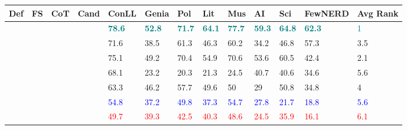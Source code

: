 \documentclass[11pt]{article}
\newcommand{\cmark}{\ding{51}}\newcommand{\xmark}{\ding{55}}\newcommand{\toolname}{PromptNER }
\begin{document}
\begin{table*}[ht]
\centering
\begin{tabular}{|l|l|l|l|l|l|l|l|l|l|l|l||l|}
\hline
Def & FS & CoT   & Cand & ConLL         & Genia         & Pol      & Lit    & Mus         & AI            & Sci       & FewNERD       & Avg Rank \\\hline
\textcolor{teal}{\cmark}        & \textcolor{teal}{\cmark}     & \textcolor{teal}{\cmark}  & \textcolor{teal}{\cmark}       & \textcolor{teal}{\textbf{78.6}} & \textcolor{teal}{\textbf{52.8}} & \textcolor{teal}{\textbf{71.7}} & \textcolor{teal}{\textbf{64.1}} & \textcolor{teal}{\textbf{77.7}} & \textcolor{teal}{\textbf{59.3}} & \textcolor{teal}{\textbf{64.8}} & \textcolor{teal}{\textbf{62.3}} & \textcolor{teal}{1}                            \\
\cmark        & \cmark     & \cmark  & \xmark      & 71.6          & 38.5          & 61.3          & 46.3          & 60.2          & 34.2          & 46.8          & 57.3          & 3.5                          \\
\cmark        & \cmark     & \xmark & \cmark       & 75.1          & 49.2          & 70.4          & 54.9          & 70.6          & 53.6          & 60.5          & 42.4          & 2.1                          \\
\cmark        & \xmark    & \cmark  & \cmark       & 68.1          & 23.2          & 20.3          & 21.3          & 24.5          & 40.7          & 40.6          & 34.6          & 5.6                          \\
\xmark       & \cmark     & \cmark  & \cmark       & 63.3          & 46.2          & 57.7          & 49.6          & 50            & 29            & 50.8          & 34.8          & 4                            \\
\textcolor{blue}{\xmark}       & \textcolor{blue}{\cmark}     & \textcolor{blue}{\cmark}  & \textcolor{blue}{\xmark}      & \textcolor{blue}{54.8}          & \textcolor{blue}{37.2}          & \textcolor{blue}{49.8}          & \textcolor{blue}{37.3}          & \textcolor{blue}{54.7}          & \textcolor{blue}{27.8}          & \textcolor{blue}{21.7}          & \textcolor{blue}{18.8}          & \textcolor{blue}{5.6}                          \\
\textcolor{red}{\xmark}       & \textcolor{red}{\cmark}     & \textcolor{red}{\xmark} & \textcolor{red}{\xmark}      & \textcolor{red}{49.7}          & \textcolor{red}{39.3}          & \textcolor{red}{42.5}          & \textcolor{red}{40.3}          & \textcolor{red}{48.6}          & \textcolor{red}{24.5}          & \textcolor{red}{35.9}          & \textcolor{red}{16.1}          & \textcolor{red}{6.1}                         

\end{tabular}
\end{table*}
\end{document}
